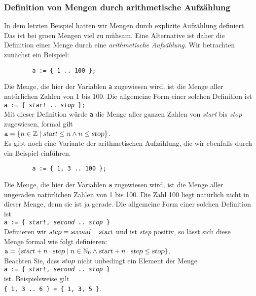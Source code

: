 \subsubsection{Definition von Mengen durch arithmetische Aufz\"{a}hlung}
In dem letzten Beispiel hatten wir Mengen durch explizite Aufz\"{a}hlung definiert.  Das ist
bei gro\3en Mengen viel zu m\"{u}hsam.  Eine Alternative ist daher die Definition einer Menge
durch eine \emph{arithmetische Aufz\"{a}hlung}.  Wir betrachten zun\"{a}chst ein Beispiel: 
\begin{verbatim}
        a := { 1 .. 100 };
\end{verbatim}
Die Menge, die hier der Variablen \texttt{a} zugewiesen wird, ist die Menge aller
nat\"{u}rlichen Zahlen von 1 bis 100.  Die allgemeine Form einer solchen Definition ist \\[0.2cm]
\hspace*{1.3cm} \texttt{a := \{ \textsl{start} .. \textsl{stop} \};} \\[0.2cm]
Mit dieser Definition w\"{u}rde \texttt{a} die Menge aller ganzen Zahlen von
\textsl{start} bis \textsl{stop} zugewiesen, formal gilt \\[0.2cm]
\hspace*{1.3cm} $\texttt{a} = \{ n \in \mathbb{Z} \mid \textsl{start} \leq n \wedge n \leq\textsl{stop} \}$. \\[0.2cm]
Es gibt noch eine Variante der arithmetischen Aufz\"{a}hlung, die wir ebenfalls durch ein
Beispiel einf\"{u}hren. 
\begin{verbatim}
        a := { 1, 3 .. 100 };
\end{verbatim}
Die Menge, die hier der Variablen \texttt{a} zugewiesen wird, ist die Menge aller
ungeraden nat\"{u}rlichen Zahlen von 1 bis 100.  Die Zahl 100 liegt nat\"{u}rlich nicht
in dieser Menge, denn sie ist ja gerade.
Die allgemeine Form einer solchen Definition ist \\[0.2cm]
\hspace*{1.3cm} 
\texttt{a := \{ \textsl{start}, \textsl{second} .. \textsl{stop} \}} \\[0.2cm]
Definieren wir $\textsl{step} = \textsl{second} - \textsl{start}$ und ist \textsl{step} positiv, so l\"{a}sst sich
diese Menge formal wie folgt definieren: 
\\[0.2cm]
\hspace*{1.3cm} 
$\texttt{a} = \{ \textsl{start} + n \cdot \textsl{step} \mid n \in \mathbb{N}_0 \wedge \textsl{start} + n \cdot \textsl{step} \leq\textsl{stop} \}$. 
\\[0.2cm]
Beachten Sie, dass $\textsl{stop}$ nicht unbedingt ein Element der Menge 
\\[0.2cm]
\hspace*{1.3cm}
\texttt{a := \{ \textsl{start}, \textsl{second} .. \textsl{stop} \}} 
\\[0.2cm]
ist.  Beispielsweise gilt
\\[0.2cm]
\hspace*{1.3cm}
\texttt{\{ 1, 3 .. 6 \} = \{ 1, 3, 5 \}}.


